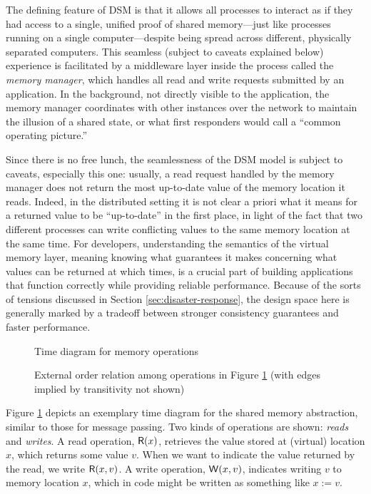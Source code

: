 \documentclass[]             %
{NASA}                       %
\theoremstyle{definition}
\begin{document}
The defining feature of DSM is that it allows all processes to
interact as if they had access to a single, unified proof of shared
memory---just like processes running on a single computer---despite
being spread across different, physically separated computers.  This
seamless (subject to caveats explained below) experience is
facilitated by a middleware layer inside the process called the
\emph{memory manager}, which handles all read and write requests
submitted by an application. In the background, not directly visible
to the application, the memory manager coordinates with other
instances over the network to maintain the illusion of a shared state,
or what first responders would call a ``common operating picture.''

Since there is no free lunch, the seamlessness of the DSM model is
subject to caveats, especially this one: usually, a read request
handled by the memory manager does not return the most up-to-date
value of the memory location it reads. Indeed, in the distributed
setting it is not clear a priori what it means for a returned value to
be ``up-to-date'' in the first place, in light of the fact that two
different processes can write conflicting values to the same memory
location at the same time. For developers, understanding the semantics
of the virtual memory layer, meaning knowing what guarantees it makes
concerning what values can be returned at which times, is a crucial
part of building applications that function correctly while providing
reliable performance. Because of the sorts of tensions discussed in
Section \ref{sec:disaster-response}, the design space here is
generally marked by a tradeoff between stronger consistency guarantees
and faster performance.

\begin{figure}
    \centering
    
    \caption{Time diagram for memory operations}
    \label{fig:dsm-example-1}
\end{figure}

\begin{figure}
  \centering
  
  \caption{External order relation among operations in Figure \ref{fig:dsm-example-1} (with edges implied by transitivity not shown)}
  \label{fig:dsm-example-1-DAG}
\end{figure}

Figure \ref{fig:dsm-example-1} depicts an exemplary time diagram for
the shared memory abstraction, similar to those for message
passing. Two kinds of operations are shown: \emph{reads} and
\emph{writes}. A read operation, $\mathsf{R}\!\left(x\right)$, retrieves the value
stored at (virtual) location $x$, which returns some value $v$. When
we want to indicate the value returned by the read, we write
$\mathsf{R}\!\left(x, v\right)$. A write operation, $\mathsf{W}\!\left(x, v\right)$, indicates
writing $v$ to memory location $x$, which in code might be written as
something like $x := v$.
\end{document}
